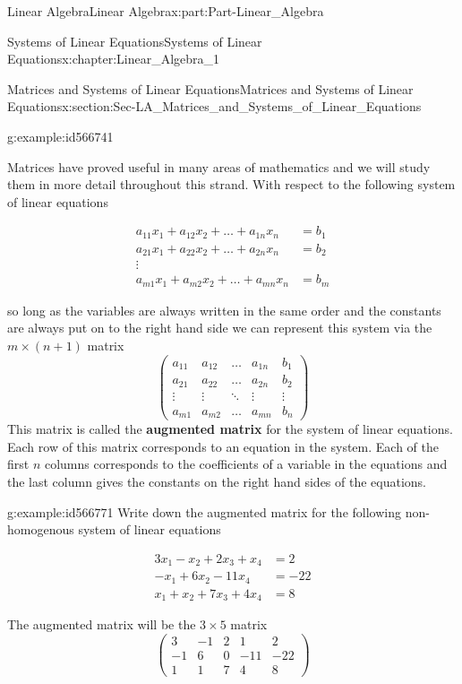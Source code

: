 \documentclass[oneside,10pt,]{book}
\newcommand{\terminology}[1]{\textbf{#1}}
\numberwithin{equation}{section}
\newcommand{\amp}{&}
\begin{document}
\begin{partptx}{Linear Algebra}{}{Linear Algebra}{}{}{x:part:Part-Linear_Algebra}
\begin{chapterptx}{Systems of Linear Equations}{}{Systems of Linear Equations}{}{}{x:chapter:Linear_Algebra_1}
\begin{sectionptx}{Matrices and Systems of Linear Equations}{}{Matrices and Systems of Linear Equations}{}{}{x:section:Sec-LA_Matrices_and_Systems_of_Linear_Equations}
\begin{example}{}{g:example:id566741}
\begin{equation*}
\end{equation*}
%
\end{example}
Matrices have proved useful in many areas of mathematics and we will study them in more detail throughout this strand. With respect to the following system of linear equations%
\par
%
\begin{align*}
a_{11}x_1+a_{12}x_2+\dots+a_{1n}x_n \amp =b_1\\
a_{21}x_1+a_{22}x_2+\dots+a_{2n}x_n \amp =b_2\\
\vdots \\
a_{m1}x_1+a_{m2}x_2+\dots+a_{mn}x_n \amp =b_m
\end{align*}
%
\par
so long as the variables are always written in the same order and the constants are always put on to the right hand side we can represent this system via the \(m\times (n+1)\) matrix%
\begin{equation*}
\begin{pmatrix} a_{11} \amp a_{12} \amp \dots \amp a_{1n} \amp b_{1} \\ a_{21} \amp a_{22} \amp \dots \amp a_{2n} \amp b_{2} \\ \vdots \amp \vdots \amp \ddots \amp \vdots \amp \vdots \\ a_{m1} \amp a_{m2} \amp \dots \amp a_{mn} \amp b_n \end{pmatrix} 
\end{equation*}
This matrix is called the \terminology{augmented matrix} for the system of linear equations. Each row of this matrix corresponds to an equation in the system. Each of the first \(n\) columns corresponds to the coefficients of a variable in the equations and the last column gives the constants on the right hand sides of the equations.%
\begin{example}{}{g:example:id566771}%
Write down the augmented matrix for the following non-homogenous system of linear equations%
\par
%
\begin{align*}
3x_1-x_2+2x_3+x_4 \amp =2\\
-x_1+6x_2-11x_4 \amp =-22\\
x_1+x_2+7x_3+4x_4 \amp =8
\end{align*}
%
\par\smallskip%
\noindent\hypertarget{g:solution:id566800}{}The augmented matrix will be the \(3\times 5\) matrix%
\begin{equation*}
\begin{pmatrix} 3 \amp -1 \amp 2 \amp 1 \amp 2 \\ -1 \amp 6 \amp 0 \amp -11 \amp -22 \\ 1 \amp 1 \amp 7 \amp 4 \amp 8 \end{pmatrix} 

\end{equation*}
\end{example}
\end{sectionptx}
\end{chapterptx}
\end{partptx}
\end{document}
